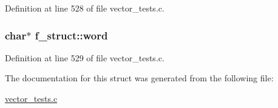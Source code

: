 Definition at line 528 of file vector\_\-tests.c.

\hypertarget{structf__struct_aa8f65f08c5e6180da916f9001438eab5}{
\subsubsection[{word}]{\setlength{\rightskip}{0pt plus 5cm}char$\ast$ {\bf f\_\-struct::word}}}
\label{structf__struct_aa8f65f08c5e6180da916f9001438eab5}


Definition at line 529 of file vector\_\-tests.c.



The documentation for this struct was generated from the following file:\begin{DoxyCompactItemize}
\item 
\hyperlink{vector__tests_8c}{vector\_\-tests.c}\end{DoxyCompactItemize}
